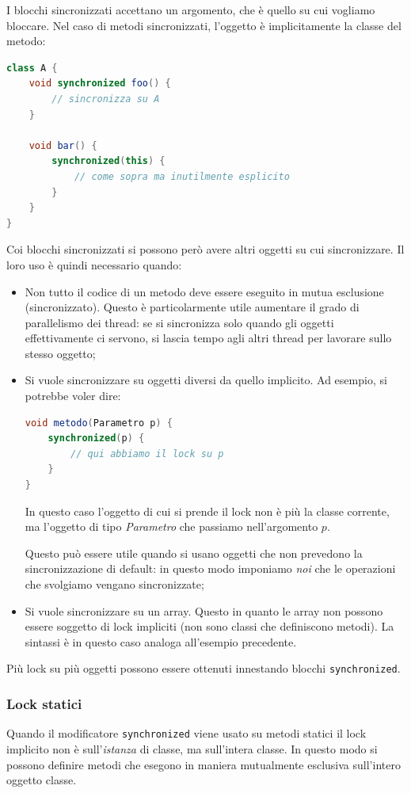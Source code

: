 \documentclass[a4paper,11pt]{article}
\begin{document}
I blocchi sincronizzati accettano un argomento, che è quello su cui vogliamo bloccare.
Nel caso di metodi sincronizzati, l'oggetto è implicitamente la classe del metodo:
\begin{lstlisting}[language=java, style=codestyle]	
class A {
	void synchronized foo() {
		// sincronizza su A
	}

	void bar() {
		synchronized(this) {
			// come sopra ma inutilmente esplicito
		}
	}
}
\end{lstlisting}
Coi blocchi sincronizzati si possono però avere altri oggetti su cui sincronizzare. Il loro uso è quindi necessario quando:
\begin{itemize}
	\item Non tutto il codice di un metodo deve essere eseguito in mutua esclusione (sincronizzato). Questo è particolarmente utile aumentare il grado di parallelismo dei thread: se si sincronizza solo quando gli oggetti effettivamente ci servono, si lascia tempo agli altri thread per lavorare sullo stesso oggetto; 
	\item Si vuole sincronizzare su oggetti diversi da quello implicito. Ad esempio, si potrebbe voler dire:
\begin{lstlisting}[language=java, style=codestyle]	
void metodo(Parametro p) {
	synchronized(p) {
		// qui abbiamo il lock su p
	}
}
\end{lstlisting}

In questo caso l'oggetto di cui si prende il lock non è più la classe corrente, ma l'oggetto di tipo \textit{Parametro} che passiamo nell'argomento $p$.

Questo può essere utile quando si usano oggetti che non prevedono la sincronizzazione di default: in questo modo imponiamo \textit{noi} che le operazioni che svolgiamo vengano sincronizzate; 

	\item Si vuole sincronizzare su un array. Questo in quanto le array non possono essere soggetto di lock impliciti (non sono classi che definiscono metodi).
		La sintassi è in questo caso analoga all'esempio precedente.
\end{itemize}

Più lock su più oggetti possono essere ottenuti innestando blocchi \lstinline|synchronized|.

\subsubsection{Lock statici}
Quando il modificatore \lstinline|synchronized| viene usato su metodi statici il lock implicito non è sull'\textit{istanza} di classe, ma sull'intera classe. In questo modo si possono definire metodi che esegono in maniera mutualmente esclusiva sull'intero oggetto classe.
\end{document}
